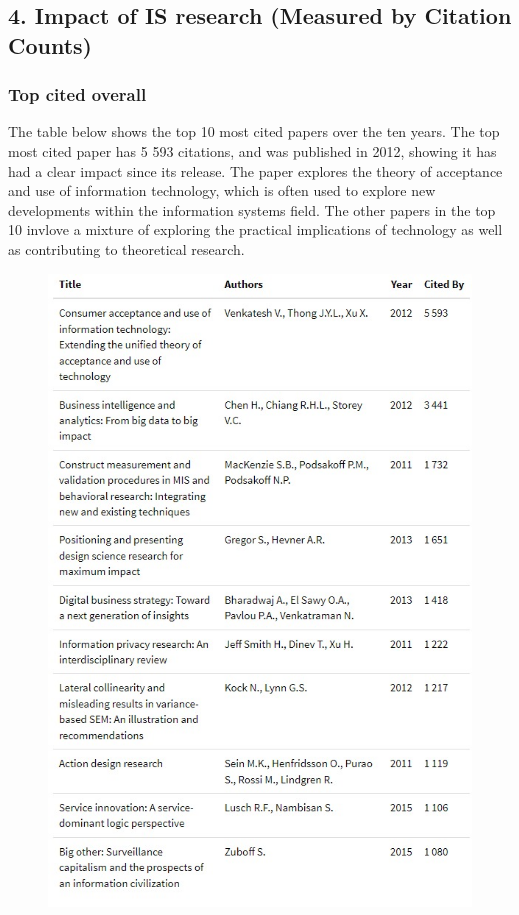 \documentclass[
  letterpaper,
  DIV=11,
  numbers=noendperiod]{scrartcl}
\begin{document}
\newpage{}

\hypertarget{impact-of-is-research-measured-by-citation-counts}{%
\subsection{4. Impact of IS research (Measured by Citation
Counts)}\label{impact-of-is-research-measured-by-citation-counts}}

\hypertarget{top-cited-overall}{%
\subsubsection{Top cited overall}\label{top-cited-overall}}

The table below shows the top 10 most cited papers over the ten years.
The top most cited paper has 5 593 citations, and was published in 2012,
showing it has had a clear impact since its release. The paper explores
the theory of acceptance and use of information technology, which is
often used to explore new developments within the information systems
field. The other papers in the top 10 invlove a mixture of exploring the
practical implications of technology as well as contributing to
theoretical research.

\begin{figure}

{\centering \includegraphics[width=4.6875in,height=\textheight]{images/topCitedOverall.jpg}

}

\end{figure}
\end{document}
